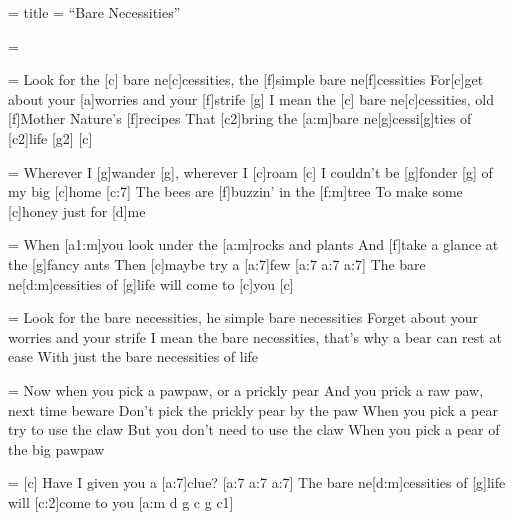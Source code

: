 \header = {
  title = ``Bare Necessities''
}

\lyrics = {
  \chorus = {
    Look for the [c] bare ne[c]cessities, the [f]simple bare ne[f]cessities
    For[c]get about your [a]worries and your [f]strife [g]
    I mean the [c] bare ne[c]cessities, old [f]Mother Nature's [f]recipes
    That [c2]bring the [a:m]bare ne[g]cessi[g]ties of [c2]life [g2] [c]
  }

  \verse = {
    Wherever I [g]wander [g], wherever I [c]roam [c]
    I couldn't be [g]fonder [g] of my big [c]home [c:7]
    The bees are [f]buzzin' in the [f:m]tree
    To make some [c]honey just for [d]me
  }

  \bridge = {
    When [a1:m]you look under the [a:m]rocks and plants
    And [f]take a glance at the [g]fancy ants
    Then [c]maybe try a [a:7]few [a:7 a:7 a:7]
    The bare ne[d:m]cessities of [g]life will come to [c]you [c]
  }
  
  \chorus = {
    Look for the bare necessities, he simple bare necessities
    Forget about your worries and your strife
    I mean the bare necessities, that's why a bear can rest at ease
    With just the bare necessities of life
  }

  \verse = {
    Now when you pick a pawpaw, or a prickly pear
    And you prick a raw paw, next time beware
    Don't pick the prickly pear by the paw
    When you pick a pear try to use the claw
    But you don't need to use the claw
    When you pick a pear of the big pawpaw
  }

  \bridge = {
    [c] Have I given you a [a:7]clue? [a:7 a:7 a:7]
    The bare ne[d:m]cessities of [g]life will [c:2]come to you [a:m d g c g c1]
  }

  \chorus

}
